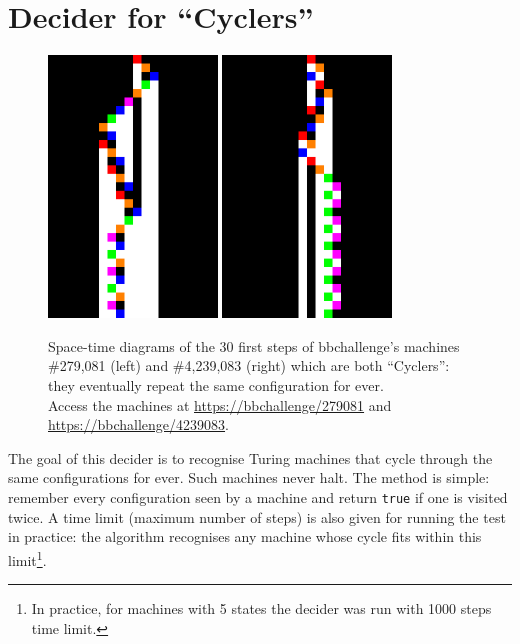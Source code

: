 \section{Decider for ``Cyclers''}\label{sec:cyclers}

\begin{figure}[h!]
\centering
\includegraphics[width=0.4\textwidth]{space-time-diagrams/cycler_279081.pdf}
\hspace{2ex}
\includegraphics[width=0.4\textwidth]{space-time-diagrams/cycler_4239083.pdf}
\caption{Space-time diagrams of the 30 first steps of bbchallenge's machines \#279,081 (left) and \#4,239,083 (right) which are both ``Cyclers'': they eventually repeat the same configuration for ever. \\
Access the machines at \url{https://bbchallenge/279081} and 
\url{https://bbchallenge/4239083}.}\label{fig:cyclers}
\end{figure}

The goal of this decider is to recognise Turing machines that cycle through the same configurations for ever. Such machines never halt. The method is simple: remember every configuration seen by a machine and return \texttt{true} if one is visited twice. A time limit (maximum number of steps) is also given for running the test in practice: the algorithm recognises any machine whose cycle fits within this limit\footnote{In practice, for machines with 5 states the decider was run with 1000 steps time limit.}.


